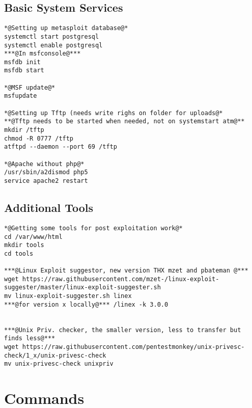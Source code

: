 \documentclass[a4paper,12pt, twoside,]{report}
\begin{document}
\subsection{Basic System Services}
\begin{lstlisting}[caption={Prepping a fresh KaliVM-2- Setting up basic Services},label=Kaliprep2]
*@Setting up metasploit database@*
systemctl start postgresql
systemctl enable postgresql
***@In msfconsole@***
msfdb init
msfdb start

*@MSF update@*
msfupdate

*@Setting up Tftp (needs write righs on folder for uploads@*
**@Tftp needs to be started when needed, not on systemstart atm@**
mkdir /tftp
chmod -R 0777 /tftp
atftpd --daemon --port 69 /tftp

*@Apache without php@*
/usr/sbin/a2dismod php5
service apache2 restart

\end{lstlisting}
\newpage
\subsection{Additional Tools}
\begin{lstlisting}[caption={Prepping a fresh KaliVM-3 - Getting Tools},label=Kaliprep3]
*@Getting some tools for post exploitation work@*
cd /var/www/html
mkdir tools
cd tools

***@Linux Exploit suggestor, new version THX mzet and pbateman @***
wget https://raw.githubusercontent.com/mzet-/linux-exploit-suggester/master/linux-exploit-suggester.sh
mv linux-exploit-suggester.sh linex
***@for version x locally@*** /linex -k 3.0.0


***@Unix Priv. checker, the smaller version, less to transfer but finds less@***
wget https://raw.githubusercontent.com/pentestmonkey/unix-privesc-check/1_x/unix-privesc-check
mv unix-privesc-check unixpriv

\end{lstlisting}


\section{Commands}
\end{document}
